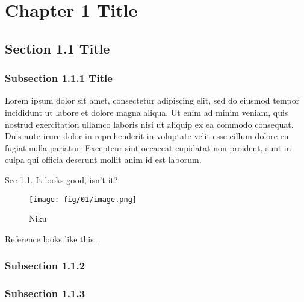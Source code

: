 \chapter{Chapter 1 Title}

\section{Section 1.1 Title}


\subsection{Subsection 1.1.1 Title}

Lorem ipsum dolor sit amet, consectetur adipiscing elit, sed do eiusmod tempor incididunt ut labore et dolore magna aliqua. Ut enim ad minim veniam, quis nostrud exercitation ullamco laboris nisi ut aliquip ex ea commodo consequat. Duis aute irure dolor in reprehenderit in voluptate velit esse cillum dolore eu fugiat nulla pariatur. Excepteur sint occaecat cupidatat non proident, sunt in culpa qui officia deserunt mollit anim id est laborum.

See \cref{fig:beef}. It looks good, isn't it?

\begin{figure}
\begin{center}
\texttt{[image: fig/01/image.png]}
\end{center}
\caption{Niku}
\label{fig:beef}
\end{figure}

Reference looks like this \cite{PDG2020}.


\subsection{Subsection 1.1.2}


\subsection{Subsection 1.1.3}



